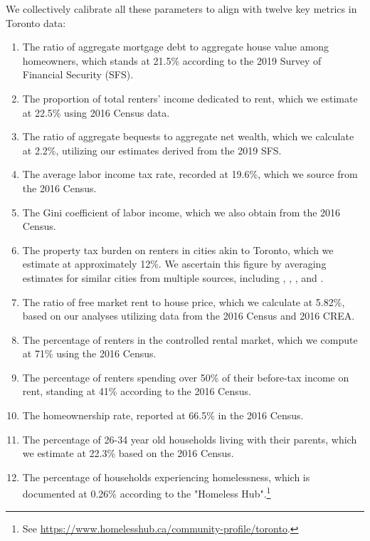 \documentclass[parskip=full]{article}
\begin{document}
We collectively calibrate all these parameters to align with twelve key metrics in Toronto data:

\begin{enumerate}
    \item The ratio of aggregate mortgage debt to aggregate house value among homeowners, which stands at 21.5\% according to the 2019 Survey of Financial Security (SFS).
    \item The proportion of total renters' income dedicated to rent, which we estimate at 22.5\% using 2016 Census data.
    \item The ratio of aggregate bequests to aggregate net wealth, which we calculate at 2.2\%, utilizing our estimates derived from the 2019 SFS.
    \item The average labor income tax rate, recorded at 19.6\%, which we source from the 2016 Census.
    \item The Gini coefficient of labor income, which we also obtain from the 2016 Census.
    \item The property tax burden on renters in cities akin to Toronto, which we estimate at approximately 12\%. We ascertain this figure by averaging estimates for similar cities from multiple sources, including \citet{cy-1994}, \citet{susin-2002}, \citet{fack-2006}, and \citet{sy-2020}.
    \item The ratio of free market rent to house price, which we calculate at 5.82\%, based on our analyses utilizing data from the 2016 Census and 2016 CREA.
    \item The percentage of renters in the controlled rental market, which we compute at 71\% using the 2016 Census. 
    \item The percentage of renters spending over 50\% of their before-tax income on rent, standing at 41\% according to the 2016 Census.
    \item The homeownership rate, reported at 66.5\% in the 2016 Census.
    \item The percentage of 26-34 year old households living with their parents, which we estimate at 22.3\% based on the 2016 Census.
    \item The percentage of households experiencing homelessness, which is documented at 0.26\% according to the "Homeless Hub".\footnote{See \url{https://www.homelesshub.ca/community-profile/toronto}.}
\end{enumerate}
\end{document}
